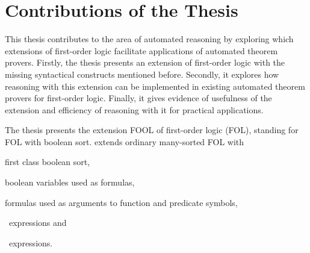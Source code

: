 \section*{Contributions of the Thesis}
\label{sect:intro:contributions}
This thesis contributes to the area of automated reasoning by exploring which extensions of first-order logic facilitate applications of automated theorem provers. Firstly, the thesis presents an extension of first-order logic with the missing syntactical constructs mentioned before. Secondly, it explores how reasoning with this extension can be implemented in existing automated theorem provers for first-order logic. Finally, it gives evidence of usefulness of the extension and efficiency of reasoning with it for practical applications.


The thesis presents the extension FOOL of first-order logic (FOL), standing for FOL with boolean sort. \folb{} extends ordinary many-sorted FOL with \begin{enumerate*}[label=(\roman*)]\item first class boolean sort, \item boolean variables used as formulas, \item formulas used as arguments to function and predicate symbols, \item \ITE\ expressions and \item \LETIN\ expressions.\end{enumerate*}

